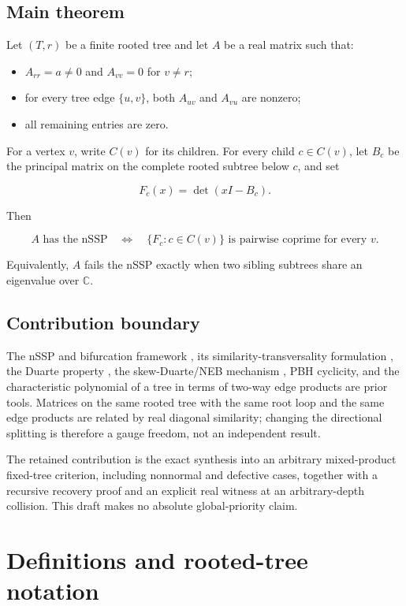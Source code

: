 \documentclass[11pt]{article}
\theoremstyle{remark}
\begin{document}
\subsection*{Main theorem}


Let $(T,r)$ be a finite rooted tree and let $A$ be a real matrix such that:

\begin{itemize}
\item $A_{rr}=a\ne0$ and $A_{vv}=0$ for $v\ne r$;
\item for every tree edge $\{u,v\}$, both $A_{uv}$ and $A_{vu}$ are nonzero;
\item all remaining entries are zero.
\end{itemize}


For a vertex $v$, write $C(v)$ for its children. For every child $c\in C(v)$, let $B_c$ be the principal matrix on the complete rooted subtree below $c$, and set

\[
F_c(x)=\det(xI-B_c).
\]

Then

\[
A\text{ has the nSSP}
\quad\Longleftrightarrow\quad
\{F_c:c\in C(v)\}\text{ is pairwise coprime for every }v.
\tag{1.1}
\]

Equivalently, $A$ fails the nSSP exactly when two sibling subtrees share an eigenvalue over $\mathbb C$.

\subsection*{Contribution boundary}


The nSSP and bifurcation framework \cite{ref1,ref2}, its similarity-transversality formulation \cite{ref11}, the Duarte property \cite{ref3,ref8}, the skew-Duarte/NEB mechanism \cite{ref4}, PBH cyclicity, and the characteristic polynomial of a tree in terms of two-way edge products are prior tools. Matrices on the same rooted tree with the same root loop and the same edge products are related by real diagonal similarity; changing the directional splitting is therefore a gauge freedom, not an independent result.

The retained contribution is the exact synthesis into an arbitrary mixed-product fixed-tree criterion, including nonnormal and defective cases, together with a recursive recovery proof and an explicit real witness at an arbitrary-depth collision. This draft makes no absolute global-priority claim.

\section{Definitions and rooted-tree notation}
\end{document}
